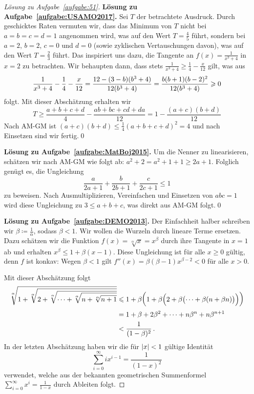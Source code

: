 \begin{proof}[Lösung zu Aufgabe~\ref{aufgabe:51}]
	\textbf{Lösung zu Aufgabe~\ref{aufgabe:USAMO2017}.} Sei $T$ der betrachtete Ausdruck. Durch geschicktes Raten vermuten wir, dass das Minimum von $T$ nicht bei $a=b=c=d=1$ angenommen wird, was auf den Wert $T=\frac45$ führt, sondern bei $a=2$, $b=2$, $c=0$ und $d=0$ (sowie zyklischen Vertauschungen davon), was auf den Wert $T=\frac23$ führt. Das inspiriert uns dazu, die Tangente an $f(x)=\frac{1}{x^3+4}$ in $x=2$ zu betrachten. Wir behaupten dann, dass stets $ \frac{1}{x^3+4}\geqslant \frac14-\frac{x}{12}$ gilt, was aus
	\begin{equation*}
		\frac1{x^3+4}-\frac14-\frac{x}{12}=\frac {12-(3-b)(b^3+4)}{12(b^3+4)}=\frac{b(b+1)(b-2)^2}{12\parens*{b^3+4}}\geqslant 0
	\end{equation*}
	folgt. Mit dieser Abschätzung erhalten wir
	\begin{equation*}
		T\geqslant \frac{a+b+c+d}4-\frac{ab+bc+cd+da}{12}=1-\frac{(a+c)(b+d)}{12}
	\end{equation*}
	Nach AM-GM ist $(a+c)(b+d)\leqslant \frac14(a+b+c+d)^2=4$ und nach Einsetzen sind wir fertig.\qed
	
	\textbf{Lösung zu Aufgabe~\ref{aufgabe:MatBoj2015}.} Um die Nenner zu linearisieren, schätzen wir nach AM-GM wie folgt ab: $a^2+2=a^2+1+1\geqslant 2a+1$. Folglich genügt es, die Ungleichung
	\begin{equation*}
		\frac{a}{2a+1}+\frac{b}{2b+1}+\frac{c}{2c+1}\leqslant 1
	\end{equation*}
	zu beweisen. Nach Ausmultiplizieren, Vereinfachen und Einsetzen von $abc=1$ wird diese Ungleichung zu $3\leqslant a+b+c$, was direkt aus AM-GM folgt.\qed
	
	\textbf{Lösung zu Aufgabe~\ref{aufgabe:DEMO2013}.} Der Einfachheit halber schreiben wir $\beta\coloneqq \frac 1\alpha$, sodass $\beta<1$. Wir wollen die Wurzeln durch lineare Terme ersetzen. Dazu schätzen wir die Funktion $f(x)=\sqrt[\alpha]{x}=x^\beta$ durch ihre Tangente in $x=1$ ab und erhalten $x^\beta\leqslant 1+\beta(x-1)$. Diese Ungleichung ist für alle $x\geqslant 0$ gültig, denn $f$ ist konkav: Wegen $\beta<1$ gilt $f''(x)=\beta(\beta-1)x^{\beta-2}<0$ für alle $x>0$.
	
	Mit dieser Abschätzung folgt
	\begin{align*}
		\sqrt[\alpha]{1+\sqrt[\alpha]{2+\sqrt[\alpha]{\dotsb+\sqrt[\alpha]{n+\sqrt[\alpha]{n+1}}}}}&\leqslant 1+\beta\parens[\bigg]{1+\beta\parens[\Big]{2+\beta\parens[\big]{\dotsb+\beta(n+\beta n)}}}\\
		&=1+\beta+2\beta^2+\dotsb+n\beta^n+n\beta^{n+1}\\
		&<\frac1{(1-\beta)^2}\,.
	\end{align*}
	In der letzten Abschätzung haben wir die für $\abs{x}<1$ gültige Identität
	\begin{equation*}
		\sum_{i=0}^\infty ix^{i-1}=\frac1{(1-x)^2}
	\end{equation*}
	verwendet, welche aus der bekannten geometrischen Summenformel $\sum_{i=0}^\infty x^i=\frac1{1-x}$ durch Ableiten folgt.
\end{proof}